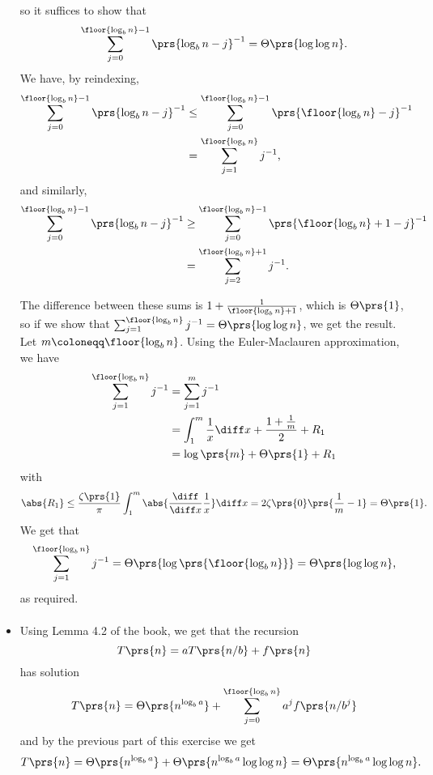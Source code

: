 \documentclass[oneside]{scrbook}
\theoremstyle{definition}
\begin{document}
\begin{exercise}
\begin{itemize}
so it suffices to show that
\begin{align*}
\sum_{j=0}^{\floor{\log_b n} - 1} \prs{\log_b n - j}^{-1} = \Theta\prs{\log \log n} \text{.}
\end{align*}
We have, by reindexing,
\begin{align*}
\sum_{j=0}^{\floor{\log_b n} - 1} \prs{\log_b n - j}^{-1}
&\leq \sum_{j=0}^{\floor{\log_b n} - 1} \prs{\floor{\log_b n} - j}^{-1}
\\&= \sum_{j = 1}^{\floor{\log_b n}} j^{-1} \text{,}
\end{align*}
and similarly,
\begin{align*}
\sum_{j=0}^{\floor{\log_b n} - 1} \prs{\log_b n - j}^{-1}
&\geq \sum_{j=0}^{\floor{\log_b n} - 1} \prs{\floor{\log_b n} + 1 - j}^{-1}
\\&= \sum_{j=2}^{\floor{\log_b n} + 1} j^{-1} \text{.}
\end{align*}

The difference between these sums is $1 + \frac{1}{\floor{\log_b n} + 1}$, which is $\Theta\prs{1}$, so if we show that $\sum_{j=1}^{\floor{\log_b n}} j^{-1} = \Theta\prs{\log \log n}$, we get the result.
Let $m \coloneqq \floor{\log_b n}$. Using the Euler-Maclauren approximation, we have
\begin{align*}
\sum_{j=1}^{\floor{\log_b n}} j^{-1} &= \sum_{j=1}^{m} j^{-1}
\\&= \int_1^m \frac{1}{x} \diff x + \frac{1 + \frac{1}{m}}{2} + R_1
\\&= \log\prs{m} + \Theta\prs{1} + R_1
\end{align*}
with
\[\abs{R_1} \leq \frac{\zeta\prs{1}}{\pi} \int_1^m \abs{ \frac{\diff}{\diff x} \frac{1}{x}} \diff x = 2 \zeta\prs{0} \prs{\frac{1}{m} - 1} = \Theta\prs{1} \text{.}\]
We get that
\[\sum_{j=1}^{\floor{\log_b n}} j^{-1} = \Theta\prs{\log\prs{\floor{\log_b n}}} = \Theta\prs{\log \log n} \text{,}\]
as required.
\begin{align*}
\end{align*}

\item Using Lemma 4.2 of the book, we get that the recursion
\[T\prs{n} = a T\prs{n/b} + f\prs{n}\]
has solution
\[T\prs{n} = \Theta\prs{n^{\log_b a}} + \sum_{j=0}^{\floor{\log_b n}} a^j f\prs{n/b^j}\]
and by the previous part of this exercise we get
\[T\prs{n} = \Theta\prs{n^{\log_b a}} + \Theta\prs{n^{\log_b a} \log \log n} = \Theta\prs{n^{\log_b a} \log \log n} \text{.}\]
\end{itemize}
\end{exercise}
\end{document}
